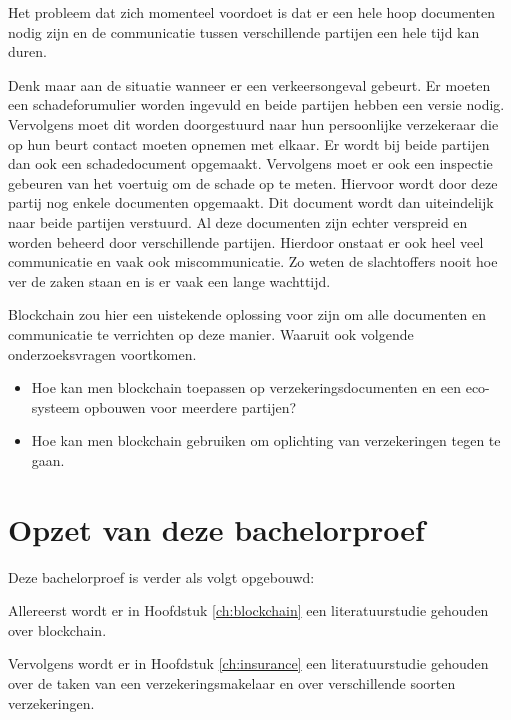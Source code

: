 Het probleem dat zich momenteel voordoet is dat er een hele hoop documenten nodig zijn en de communicatie tussen verschillende partijen een hele tijd kan duren.

Denk maar aan de situatie wanneer er een verkeersongeval gebeurt. Er moeten een schadeforumulier worden ingevuld en beide partijen hebben een versie nodig. Vervolgens moet dit worden doorgestuurd naar hun persoonlijke verzekeraar die op hun beurt contact moeten opnemen met elkaar. Er wordt bij beide partijen dan ook een schadedocument opgemaakt. Vervolgens moet er ook een inspectie gebeuren van het voertuig om de schade op te meten. Hiervoor wordt door deze partij nog enkele documenten opgemaakt. Dit document wordt dan uiteindelijk naar beide partijen verstuurd. Al deze documenten zijn echter verspreid en worden beheerd door verschillende partijen. Hierdoor onstaat er ook heel veel communicatie en vaak ook miscommunicatie. Zo weten de slachtoffers nooit hoe ver de zaken staan en is er vaak een lange wachttijd. 

Blockchain zou hier een uistekende oplossing voor zijn om alle documenten en communicatie te verrichten op deze manier. Waaruit ook volgende onderzoeksvragen voortkomen.
\begin{itemize}
	\item Hoe kan men blockchain toepassen op verzekeringsdocumenten en een eco-systeem opbouwen voor meerdere partijen?
	\item Hoe kan men blockchain gebruiken om oplichting van verzekeringen tegen te gaan.
\end{itemize}

\section{Opzet van deze bachelorproef}
\label{sec:opzet-bachelorproef}


Deze bachelorproef is verder als volgt opgebouwd:

Allereerst wordt er in Hoofdstuk \ref{ch:blockchain} een literatuurstudie gehouden over blockchain.

Vervolgens wordt er in Hoofdstuk \ref{ch:insurance} een literatuurstudie gehouden over de taken van een verzekeringsmakelaar en over verschillende soorten verzekeringen. 

